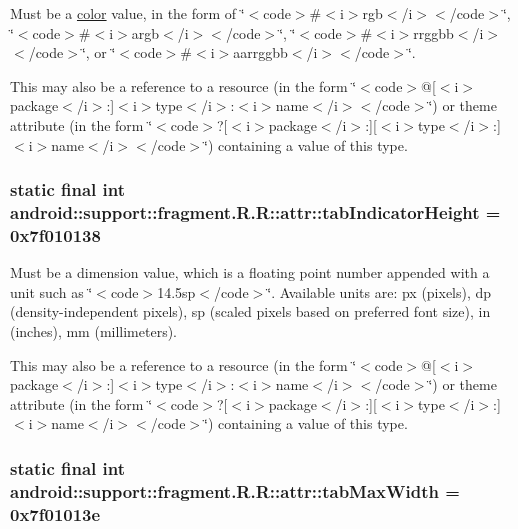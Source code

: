 Must be a \hyperlink{classandroid_1_1support_1_1fragment_1_1_r_1_1color}{color} value, in the form of \char`\"{}$<$code$>$\#$<$i$>$rgb$<$/i$>$$<$/code$>$\char`\"{}, \char`\"{}$<$code$>$\#$<$i$>$argb$<$/i$>$$<$/code$>$\char`\"{}, \char`\"{}$<$code$>$\#$<$i$>$rrggbb$<$/i$>$$<$/code$>$\char`\"{}, or \char`\"{}$<$code$>$\#$<$i$>$aarrggbb$<$/i$>$$<$/code$>$\char`\"{}. 

This may also be a reference to a resource (in the form \char`\"{}$<$code$>$@\mbox{[}$<$i$>$package$<$/i$>$:\mbox{]}$<$i$>$type$<$/i$>$:$<$i$>$name$<$/i$>$$<$/code$>$\char`\"{}) or theme attribute (in the form \char`\"{}$<$code$>$?\mbox{[}$<$i$>$package$<$/i$>$:\mbox{]}\mbox{[}$<$i$>$type$<$/i$>$:\mbox{]}$<$i$>$name$<$/i$>$$<$/code$>$\char`\"{}) containing a value of this type. \hypertarget{classandroid_1_1support_1_1fragment_1_1_r_1_1attr_a69b9b7dd370b1e41d00b2f8a376db0d}{
\subsubsection[{tabIndicatorHeight}]{\setlength{\rightskip}{0pt plus 5cm}static final int android::support::fragment.R.R::attr::tabIndicatorHeight = 0x7f010138}}
\label{classandroid_1_1support_1_1fragment_1_1_r_1_1attr_a69b9b7dd370b1e41d00b2f8a376db0d}


Must be a dimension value, which is a floating point number appended with a unit such as \char`\"{}$<$code$>$14.5sp$<$/code$>$\char`\"{}. Available units are: px (pixels), dp (density-independent pixels), sp (scaled pixels based on preferred font size), in (inches), mm (millimeters). 

This may also be a reference to a resource (in the form \char`\"{}$<$code$>$@\mbox{[}$<$i$>$package$<$/i$>$:\mbox{]}$<$i$>$type$<$/i$>$:$<$i$>$name$<$/i$>$$<$/code$>$\char`\"{}) or theme attribute (in the form \char`\"{}$<$code$>$?\mbox{[}$<$i$>$package$<$/i$>$:\mbox{]}\mbox{[}$<$i$>$type$<$/i$>$:\mbox{]}$<$i$>$name$<$/i$>$$<$/code$>$\char`\"{}) containing a value of this type. \hypertarget{classandroid_1_1support_1_1fragment_1_1_r_1_1attr_519fe495268594b9815ad0c0fd1686f4}{
\subsubsection[{tabMaxWidth}]{\setlength{\rightskip}{0pt plus 5cm}static final int android::support::fragment.R.R::attr::tabMaxWidth = 0x7f01013e}}
\label{classandroid_1_1support_1_1fragment_1_1_r_1_1attr_519fe495268594b9815ad0c0fd1686f4}


